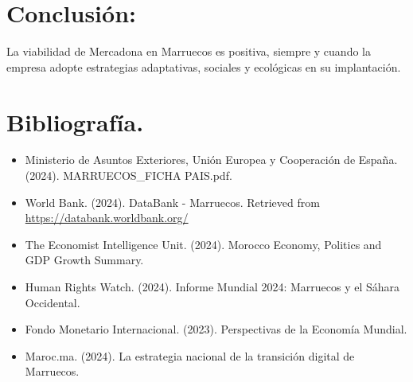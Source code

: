 \documentclass{article}  %
\begin{document}
\section{Conclusión:}\label{conclusiuxf3n}

La viabilidad de Mercadona en Marruecos es positiva, siempre y cuando la
empresa adopte estrategias adaptativas, sociales y ecológicas en su
implantación.

\section{Bibliografía.}\label{bibliografuxeda.}


\begin{itemize}
\item
  Ministerio de Asuntos Exteriores, Unión Europea y Cooperación de
  España. (2024). MARRUECOS\_FICHA PAIS.pdf.
\item
  World Bank. (2024). DataBank - Marruecos. Retrieved from
  \url{https://databank.worldbank.org/}
\item
  The Economist Intelligence Unit. (2024). Morocco Economy, Politics and
  GDP Growth Summary.
\item
  Human Rights Watch. (2024). Informe Mundial 2024: Marruecos y el
  Sáhara Occidental.
\item
  Fondo Monetario Internacional. (2023). Perspectivas de la Economía
  Mundial.
\item
  Maroc.ma. (2024). La estrategia nacional de la transición digital de
  Marruecos.
\end{itemize}
\end{document}
